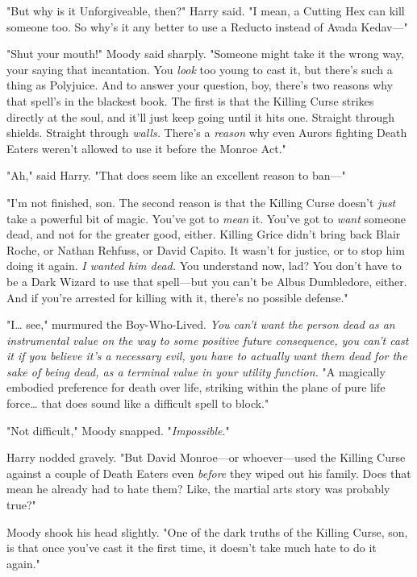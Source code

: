 "But why is it Unforgiveable, then?" Harry said. "I mean, a Cutting Hex can 
kill someone too. So why's it any better to use a Reducto instead of Avada 
Kedav---"

"Shut your mouth!" Moody said sharply. "Someone might take it the wrong way, 
your saying that incantation. You \emph{look} too young to cast it, but there's 
such a thing as Polyjuice. And to answer your question, boy, there's two 
reasons why that spell's in the blackest book. The first is that the Killing 
Curse strikes directly at the soul, and it'll just keep going until it hits 
one. Straight through shields. Straight through \emph{walls.} There's a 
\emph{reason} why even Aurors fighting Death Eaters weren't allowed to use it 
before the Monroe Act."

"Ah," said Harry. "That does seem like an excellent reason to ban---"

"I'm not finished, son. The second reason is that the Killing Curse doesn't 
\emph{just} take a powerful bit of magic. You've got to \emph{mean} it. You've 
got to \emph{want} someone dead, and not for the greater good, either. Killing 
Grice didn't bring back Blair Roche, or Nathan Rehfuss, or David Capito. It 
wasn't for justice, or to stop him doing it again. \emph{I wanted him dead.} 
You understand now, lad? You don't have to be a Dark Wizard to use that 
spell---but you can't be Albus Dumbledore, either. And if you're arrested for 
killing with it, there's no possible defense."

"I{\ldots} see," murmured the Boy-Who-Lived. \emph{You can't want the person 
dead as an instrumental value on the way to some positive future consequence, 
you can't cast it if you believe it's a necessary evil, you have to actually 
want them dead for the sake of being dead, as a terminal value in your utility 
function.} "A magically embodied preference for death over life, striking 
within the plane of pure life force{\ldots} that does sound like a difficult 
spell to block."

"Not difficult," Moody snapped. "\emph{Impossible}."

Harry nodded gravely. "But David Monroe---or whoever---used the Killing Curse 
against a couple of Death Eaters even \emph{before} they wiped out his family. 
Does that mean he already had to hate them? Like, the martial arts story was 
probably true?"

Moody shook his head slightly. "One of the dark truths of the Killing Curse, 
son, is that once you've cast it the first time, it doesn't take much hate to 
do it again."

